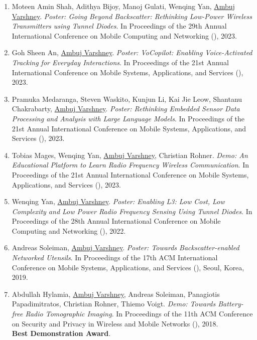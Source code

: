 \begin{enumerate}
\item Moteen Amin Shah\ug, Adithya Bijoy\ug, Manoj Gulati\postdoc, Wenqing Yan\phd, \underline{Ambuj Varshney}. 
\emph{Poster: Going Beyond Backscatter: Rethinking Low-Power Wireless Transmitters using Tunnel Diodes}. 
In Proceedings of the 29th Annual International Conference on Mobile Computing and Networking (), 2023.

\item Goh Sheen An\pg, \underline{Ambuj Varshney}. 
\emph{Poster: VoCopilot: Enabling Voice-Activated Tracking for Everyday Interactions}. 
In Proceedings of the 21st Annual International Conference on Mobile Systems, Applications, and Services (), 2023.

\item Pramuka Medaranga\phd, Steven Waskito\ug, Kunjun Li\ug, Kai Jie Leow\ug, Shantanu Chakrabarty, \underline{Ambuj Varshney}. 
\emph{Poster: Rethinking Embedded Sensor Data Processing and Analysis with Large Language Models}. 
In Proceedings of the 21st Annual International Conference on Mobile Systems, Applications, and Services (), 2023.

\item Tobias Mages, Wenqing Yan\phd, \underline{Ambuj Varshney}, Christian Rohner. 
\emph{Demo: An Educational Platform to Learn Radio Frequency Wireless Communication}. 
In Proceedings of the 21st Annual International Conference on Mobile Systems, Applications, and Services (), 2023.


\item Wenqing Yan\phd, \underline{Ambuj Varshney}. 
\emph{Poster: Enabling L3: Low Cost, Low Complexity and Low Power Radio Frequency Sensing Using Tunnel Diodes}. 
In Proceedings of the 28th Annual International Conference on Mobile Computing and Networking (), 2022.


\item Andreas Soleiman\ug, \underline{Ambuj Varshney}. 
\emph{Poster: Towards Backscatter-enabled Networked Utensils}. 
In Proceedings of the 17th ACM International Conference on Mobile Systems, Applications, and Services (), Seoul, Korea, 2019.


\item Abdullah Hylamia\pg, \underline{Ambuj Varshney}, Andreas Soleiman\ug, Panagiotis Papadimitratos, Christian Rohner, Thiemo Voigt. 
\emph{Demo: Towards Battery-free Radio Tomographic Imaging}. 
In Proceedings of the 11th ACM Conference on Security and Privacy in Wireless and Mobile Networks (), 2018.\\
\textcolor{alert}{\textbf{Best Demonstration Award}}.


\end{enumerate}
